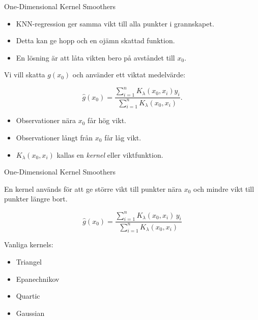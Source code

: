 \documentclass[10pt,english]{beamer}
\begin{document}
\begin{frame}{One-Dimensional Kernel Smoothers}

    \begin{itemize}
        \item KNN-regression ger samma vikt till alla punkter i grannskapet.
        \item Detta kan ge hopp och en ojämn skattad funktion.
        \item En lösning är att låta vikten bero på avståndet till $x_0$.
    \end{itemize}

    \medskip

    Vi vill skatta $g(x_0)$ och använder ett viktat medelvärde:

    \[
        \hat g(x_0)
        =
        \frac{
            \sum_{i=1}^{n}
            K_{\lambda}(x_0,x_i)y_i
        }{
            \sum_{i=1}^{n}
            K_{\lambda}(x_0,x_i)
        }.
    \]

    \medskip

    \begin{itemize}
        \item Observationer nära $x_0$ får hög vikt.
        \item Observationer långt från $x_0$ får låg vikt.
        \item $K_{\lambda}(x_0,x_i)$ kallas en \emph{kernel} eller viktfunktion.
    \end{itemize}

\end{frame}


\begin{frame}{One-Dimensional Kernel Smoothers}

    En kernel används för att ge större vikt till punkter nära
    \(x_0\) och mindre vikt till punkter längre bort.

    \[
        \hat g(x_0)
        =
        \frac{\sum_{i=1}^n K_\lambda(x_0,x_i)\,y_i}
             {\sum_{i=1}^n K_\lambda(x_0,x_i)}
    \]

    \vspace{0.3cm}

    Vanliga kernels:

    \begin{itemize}
        \item Triangel
        \item Epanechnikov
        \item Quartic
        \item Gaussian
    \end{itemize}



\end{frame}
\end{document}
